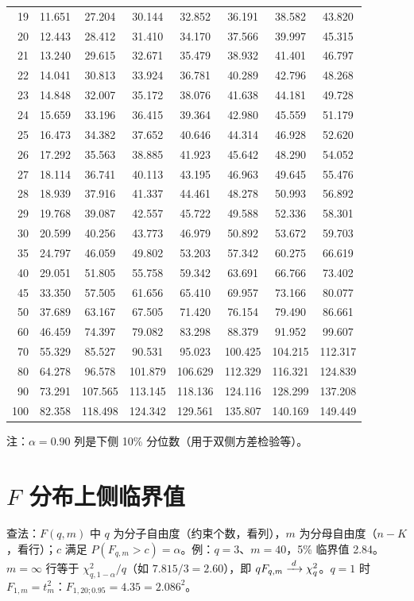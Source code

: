 \begin{center}
\begin{tabular}{r|ccccccc}
19 & 11.651 & 27.204 & 30.144 & 32.852 & 36.191 & 38.582 & 43.820\\
20 & 12.443 & 28.412 & 31.410 & 34.170 & 37.566 & 39.997 & 45.315\\
21 & 13.240 & 29.615 & 32.671 & 35.479 & 38.932 & 41.401 & 46.797\\
22 & 14.041 & 30.813 & 33.924 & 36.781 & 40.289 & 42.796 & 48.268\\
23 & 14.848 & 32.007 & 35.172 & 38.076 & 41.638 & 44.181 & 49.728\\
24 & 15.659 & 33.196 & 36.415 & 39.364 & 42.980 & 45.559 & 51.179\\
25 & 16.473 & 34.382 & 37.652 & 40.646 & 44.314 & 46.928 & 52.620\\
26 & 17.292 & 35.563 & 38.885 & 41.923 & 45.642 & 48.290 & 54.052\\
27 & 18.114 & 36.741 & 40.113 & 43.195 & 46.963 & 49.645 & 55.476\\
28 & 18.939 & 37.916 & 41.337 & 44.461 & 48.278 & 50.993 & 56.892\\
29 & 19.768 & 39.087 & 42.557 & 45.722 & 49.588 & 52.336 & 58.301\\
30 & 20.599 & 40.256 & 43.773 & 46.979 & 50.892 & 53.672 & 59.703\\
35 & 24.797 & 46.059 & 49.802 & 53.203 & 57.342 & 60.275 & 66.619\\
40 & 29.051 & 51.805 & 55.758 & 59.342 & 63.691 & 66.766 & 73.402\\
45 & 33.350 & 57.505 & 61.656 & 65.410 & 69.957 & 73.166 & 80.077\\
50 & 37.689 & 63.167 & 67.505 & 71.420 & 76.154 & 79.490 & 86.661\\
60 & 46.459 & 74.397 & 79.082 & 83.298 & 88.379 & 91.952 & 99.607\\
70 & 55.329 & 85.527 & 90.531 & 95.023 & 100.425 & 104.215 & 112.317\\
80 & 64.278 & 96.578 & 101.879 & 106.629 & 112.329 & 116.321 & 124.839\\
90 & 73.291 & 107.565 & 113.145 & 118.136 & 124.116 & 128.299 & 137.208\\
100 & 82.358 & 118.498 & 124.342 & 129.561 & 135.807 & 140.169 & 149.449\\
\bottomrule\end{tabular}\end{center}
注：$\alpha=0.90$ 列是下侧 10\% 分位数（用于双侧方差检验等）。
\section{\texorpdfstring{$F$}{F} 分布上侧临界值}
查法：$F(q,m)$ 中 $q$ 为分子自由度（约束个数，看列），$m$ 为分母自由度（$n-K$，看行）；$c$ 满足 $P(F_{q,m}>c)=\alpha$。例：$q=3$、$m=40$，5\% 临界值 2.84。$m=\infty$ 行等于 $\chi^2_{q,1-\alpha}/q$（如 $7.815/3=2.60$），即 $qF_{q,m}\xrightarrow{\;d\;}\chi^2_q$。$q=1$ 时 $F_{1,m}=t_m^2$：$F_{1,20;0.95}=4.35=2.086^2$。
